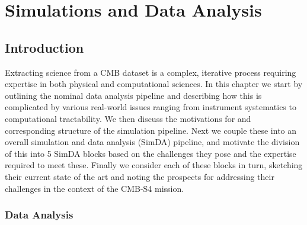  
\chapter{Simulations and Data Analysis}
\renewcommand*\thesection{\arabic{section}}


\section{Introduction}

Extracting science from a CMB dataset is a complex, iterative process requiring expertise in both physical and computational sciences. In this chapter we start by outlining the nominal data analysis pipeline and describing how this is complicated by various real-world issues ranging from instrument systematics to computational tractability. We then discuss the motivations for and corresponding structure of the simulation pipeline. Next we couple these into an overall simulation and data analysis (SimDA) pipeline, and motivate the division of this into 5 SimDA blocks based on the challenges they pose and the expertise required to meet these. Finally we consider each of these blocks in turn, sketching their current state of the art and noting the prospects for addressing their challenges in the context of the CMB-S4 mission.

\newpage

\subsection{Data Analysis}

